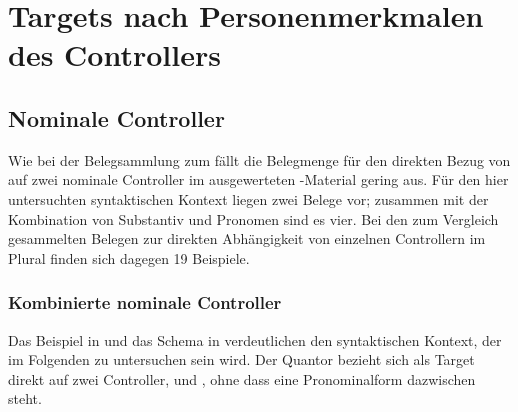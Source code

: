 
\section{Targets nach Personenmerkmalen des Controllers}
\label{sec:kctargpers}

\subsection{Nominale Controller}

Wie bei der Belegsammlung zum \CAO{} fällt die Belegmenge für den
direkten Bezug von  auf zwei nominale Controller im ausgewerteten
\KC{}-Material gering aus. Für den hier untersuchten syntaktischen Kontext
liegen zwei Belege vor; zusammen mit der Kombination von Substantiv und
Pronomen sind es vier. Bei den zum Vergleich gesammelten Belegen zur direkten
Abhängigkeit von einzelnen Controllern im Plural finden sich dagegen 19
Beispiele.

\subsubsection{Kombinierte nominale Controller}
\label{subsubsec:conomctrlpers}

Das Beispiel in  und das Schema in 
verdeutlichen den syntaktischen Kontext, der im Folgenden zu untersuchen sein
wird. Der Quantor  bezieht sich als Target direkt auf zwei
Controller,  und , ohne dass eine Pronominalform
dazwischen steht.

\begin{exe}
\end{exe}

